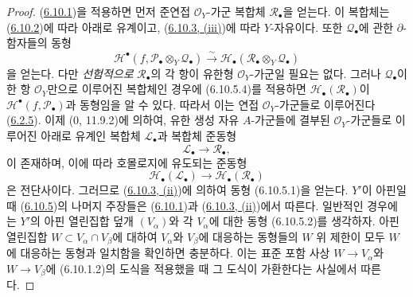 \begin{proof}
(\hyperref[III.6.10.1-fr]{6.10.1})을 적용하면 먼저 준연접
$\mathscr O_Y$-가군 복합체 $\mathscr R_\bullet$을 얻는다. 이 복합체는
(\hyperref[III.6.10.2-fr]{6.10.2})에 따라 아래로 유계이고,
(\hyperref[III.6.10.3-fr]{6.10.3, (iii)})에 따라 $Y$-자유이다. 또한
$\mathscr Q_\bullet$에 관한 $\partial$-함자들의 동형
\[
  \mathscr H^\bullet
  (f,\mathscr P_\bullet\otimes_Y\mathscr Q_\bullet)
  \xrightarrow{\sim}
  \mathscr H_\bullet
  (\mathscr R_\bullet\otimes_Y\mathscr Q_\bullet)
  \tag{6.10.5.4}\label{III.6.10.5.4.fr}
\]
을 얻는다. 다만 \emph{선험적으로} $\mathscr R_\bullet$의 각 항이
유한형 $\mathscr O_Y$-가군일 필요는 없다. 그러나
$\mathscr Q_\bullet$이 한 항 $\mathscr O_Y$만으로 이루어진 복합체인
경우에 (6.10.5.4)를 적용하면
$\mathscr H_\bullet(\mathscr R_\bullet)$이
$\mathscr H^\bullet(f,\mathscr P_\bullet)$과 동형임을 알 수 있다.
따라서 이는 연접 $\mathscr O_Y$-가군들로 이루어진다
(\hyperref[III.6.2.5-fr]{6.2.5}). 이제 (0, 11.9.2)에 의하여,
유한 생성 자유 $A$-가군들에 결부된 $\mathscr O_Y$-가군들로
이루어진 아래로 유계인 복합체 $\mathscr L_\bullet$과 복합체 준동형
\[
  \mathscr L_\bullet\longrightarrow\mathscr R_\bullet,
\]
이 존재하며, 이에 따라 호몰로지에 유도되는 준동형
\[
  \mathscr H_\bullet(\mathscr L_\bullet)
  \longrightarrow
  \mathscr H_\bullet(\mathscr R_\bullet)
\]
은 전단사이다. 그러므로
(\hyperref[III.6.10.3-fr]{6.10.3, (ii)})에 의하여 동형
(6.10.5.1)을 얻는다. $Y'$이 아핀일 때
(\hyperref[III.6.10.5-fr]{6.10.5})의 나머지 주장들은
(\hyperref[III.6.10.1-fr]{6.10.1})과
(\hyperref[III.6.10.3-fr]{6.10.3, (ii)})에서 따른다. 일반적인
경우에는 $Y'$의 아핀 열린집합 덮개 $(V_\alpha)$와 각
$V_\alpha$에 대한 동형 (6.10.5.2)를 생각하자. 아핀 열린집합
$W\subset V_\alpha\cap V_\beta$에 대하여 $V_\alpha$와
$V_\beta$에 대응하는 동형들의 $W$ 위 제한이 모두 $W$에
대응하는 동형과 일치함을 확인하면 충분하다. 이는 표준 포함 사상
$W\to V_\alpha$와 $W\to V_\beta$에
(6.10.1.2)의 도식을 적용했을 때 그 도식이 가환한다는 사실에서
따른다.
\end{proof}


